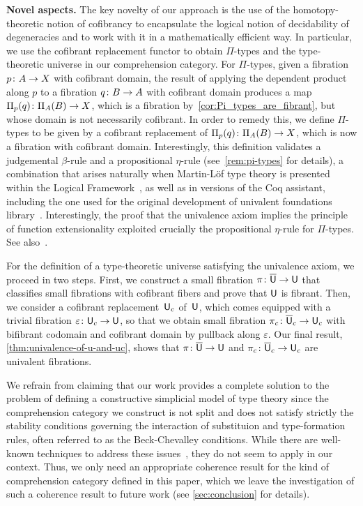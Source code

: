 \documentclass[reqno,10pt,a4paper,oneside,draft]{amsart}
\begin{document}
\smallskip

\noindent
\textbf{Novel aspects.} The key novelty of our approach is the use of the homotopy-theoretic notion of cofibrancy to encapsulate the logical notion of decidability of degeneracies and to work with it in a 
mathematically efficient way. In particular, we use the cofibrant  replacement functor
to obtain $\Pi$-types and the type-theoretic universe in our comprehension category.  For $\Pi$-types, given a fibration $p \colon A \to X$ with cofibrant domain, the result of applying the dependent product along $p$ to a fibration $q \colon B \to A$ with cofibrant domain produces a map  $\Pi_p(q) \colon \Pi_A(B) \to X$, which is a fibration by~\cref{cor:Pi_types_are_fibrant}, but whose domain
is not necessarily cofibrant. In order to remedy this, we define  $\Pi$-types to be given by a cofibrant replacement of
$\Pi_p(q) \colon \Pi_A(B) \to X$, which is now a fibration with cofibrant domain. 
Interestingly, this definition validates
a judgemental $\beta$-rule and a propositional $\eta$-rule (see~\cref{rem:pi-types} for details), a combination that arises naturally when  Martin-L\"of type theory is presented
within the Logical Framework~\cite{nordstrom-petersson-smith:ml}, as well as in
versions of the Coq assistant, including the one used for the original development of  univalent foundations
library~\cite{voevodsky:library}. Interestingly, the proof that the univalence axiom implies the principle of function extensionality exploited crucially the propositional $\eta$-rule for $\Pi$-types. See also~\cite{GarnerR:strdp}.

For the definition of a  type-theoretic universe satisfying the univalence axiom, we proceed
in two steps. First, we construct a small fibration $\pi \colon \overline{\mathsf{U}} \to \mathsf{U}$ that classifies small fibrations with cofibrant fibers and prove that $\mathsf{U}$ is fibrant. 
Then, we consider a cofibrant replacement~$\mathsf{U}_c$ of~$\mathsf{U}$, which comes equipped with a trivial fibration $\varepsilon \colon \mathsf{U}_c \to \mathsf{U}$, so that 
we obtain small fibration $\pi_c \colon \overline{\mathsf{U}}_c \to \mathsf{U}_c$ with bifibrant codomain and cofibrant domain by pullback along $\varepsilon$. Our final result, \cref{thm:univalence-of-u-and-uc}, shows that
$\pi \colon \overline{\mathsf{U}} \to \mathsf{U}$ and $\pi_c \colon \overline{\mathsf{U}}_c \to \mathsf{U}_c$ are univalent fibrations. 



We refrain from claiming that our work provides a complete solution to the problem of defining a constructive simplicial model of type theory since the comprehension category we construct is not split and does not
satisfy strictly the stability conditions governing the interaction of substituion and type-formation rules, often
referred to as the Beck-Chevalley conditions. While there are well-known techniques to address these issues~\cite{voevodsky-simplicial-model,LumsdaineP:locuoc,ShulmanM:allths}, they do not seem to apply in our  context.
Thus, we only need an appropriate coherence result for the kind of 
comprehension category defined in this paper, 
which we leave the investigation of such a coherence result to future work (see \cref{sec:conclusion} for
details).
\end{document}
